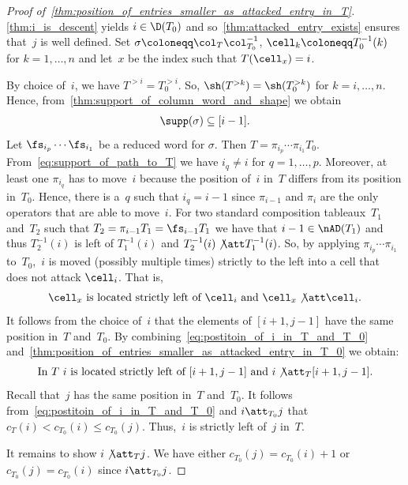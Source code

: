 \begin{proof}[Proof of~\cref{thm:position_of_entries_smaller_as_attacked_entry_in_T}] 
	\cref{thm:i_is_descent} yields $i\in \D(T_0)$ and so~\cref{thm:attacked_entry_exists} ensures that~$j$ is well defined. Set $\sigma \coloneqq \col_T\col^{-1}_{T_0}$, $\cell_k \coloneqq T_0^{-1}(k)$ for $k=1,\dots, n$ and let~$x$ be the index such that $T(\cell_x)= i$. 

	 By choice of~$i$, we have $T^{>i} = T_0^{>i}$. So, $\sh (T^{>k}) = \sh (T_0^{>k})$ for $k = i ,\dots, n$. Hence, from~\cref{thm:support_of_column_word_and_shape} we obtain 
		\begin{align}
		\label{eq:support_of_path_to_T}
			\supp(\sigma) \subseteq [i-1].	
		\end{align}
	Let $\fs_{i_p} \cdots \fs_{i_1}$ be a reduced word for $\sigma$.
	Then $T = \pi_{i_p} \cdots \pi_{i_1} T_0$. From~\eqref{eq:support_of_path_to_T} we have $i_q \neq i$ for $q=1,\dots, p$.
	Moreover, at least one $\pi_{i_q}$ has to move~$i$ because the position of~$i$ in~$T$ differs from its position in~$T_0$. Hence, there is a~$q$ such that $i_q = i-1$ since $\pi_{i-1}$ and $\pi_i$ are the only operators that are able to move~$i$.
	For two standard composition tableaux~$T_1$ and~$T_2$ such that $T_2 = \pi_{i-1}T_1= \fs_{i-1} T_1$ we have that $i-1\in \nAD (T_1)$ and thus $T_2^{-1}(i)$ is left of $T_1^{-1}(i)$ and $T_2^{-1}(i) \not \att T_1^{-1}(i)$. So, by applying $\pi_{i_p} \cdots \pi_{i_1}$ to~$T_0$,~$i$ is moved (possibly multiple times) strictly to the left into a cell that does not attack $\cell_i$. That is,
	\begin{align}
		\label{eq:postitoin_of_i_in_T_and_T_0}
		\text{$\cell_x$ is located strictly left of $\cell_i$ and $\cell_x\not \att \cell_i$.}
	\end{align}
	It follows from the choice of~$i$ that the elements of $[i+1,j-1]$ have the same position in~$T$ and~$T_0$. By combining~\eqref{eq:postitoin_of_i_in_T_and_T_0} and~\cref{thm:position_of_entries_smaller_as_attacked_entry_in_T_0} we obtain:
	\begin{align}
	\text{In~$T$~$i$ is located strictly left of $[i+1,j-1]$ and $i\not \att_T [i+1,j-1]$.}
	\end{align}
	Recall that~$j$ has the same position in~$T$ and~$T_0$. 
	It follows from~\eqref{eq:postitoin_of_i_in_T_and_T_0} and $i\att_{T_0} j$ that $c_T(i) < c_{T_0}(i)\leq c_{T_0}(j)$. Thus,~$i$ is strictly left of~$j$ in~$T$.
	
	It remains to show $i\not \att_T j$.
	 We have either $c_{T_0}(j)=c_{T_0}(i)+1$ or $c_{T_0}(j)=c_{T_0}(i)$ since $i\att_{T_0} j$.
	

\end{proof}
